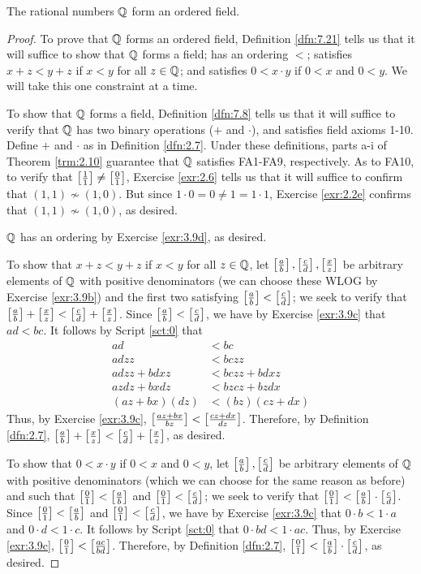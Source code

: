 \documentclass[../main.tex]{subfiles}
\begin{document}
\begin{theorem}\label{trm:7.29}
    The rational numbers $\mathbb{Q}$ form an ordered field.
    \begin{proof}
        To prove that $\mathbb{Q}$ forms an ordered field, Definition \ref{dfn:7.21} tells us that it will suffice to show that $\mathbb{Q}$ forms a field; has an ordering $<$; satisfies $x+z<y+z$ if $x<y$ for all $z\in\mathbb{Q}$; and satisfies $0<x\cdot y$ if $0<x$ and $0<y$. We will take this one constraint at a time.\par\smallskip
        To show that $\mathbb{Q}$ forms a field, Definition \ref{dfn:7.8} tells us that it will suffice to verify that $\mathbb{Q}$ has two binary operations ($+$ and $\cdot$), and satisfies field axioms 1-10. Define $+$ and $\cdot$ as in Definition \ref{dfn:2.7}. Under these definitions, parts a-i of Theorem \ref{trm:2.10} guarantee that $\mathbb{Q}$ satisfies FA1-FA9, respectively. As to FA10, to verify that $\left[ \frac{1}{1} \right]\neq\left[ \frac{0}{1} \right]$, Exercise \ref{exr:2.6} tells us that it will suffice to confirm that $(1,1)\nsim(1,0)$. But since $1\cdot 0=0\neq 1=1\cdot 1$, Exercise \ref{exr:2.2e} confirms that $(1,1)\nsim(1,0)$, as desired.\par
        $\mathbb{Q}$ has an ordering by Exercise \ref{exr:3.9d}, as desired.\par
        To show that $x+z<y+z$ if $x<y$ for all $z\in\mathbb{Q}$, let $\left[ \frac{a}{b} \right],\left[ \frac{c}{d} \right],\left[ \frac{x}{z} \right]$ be arbitrary elements of $\mathbb{Q}$ with positive denominators (we can choose these WLOG by Exercise \ref{exr:3.9b}) and the first two satisfying $\left[ \frac{a}{b} \right]<\left[ \frac{c}{d} \right]$; we seek to verify that $\left[ \frac{a}{b} \right]+\left[ \frac{x}{z} \right]<\left[ \frac{c}{d} \right]+\left[ \frac{x}{z} \right]$. Since $\left[ \frac{a}{b} \right]<\left[ \frac{c}{d} \right]$, we have by Exercise \ref{exr:3.9c} that $ad<bc$. It follows by Script \ref{sct:0} that
        \begin{align*}
            ad &< bc\\
            adzz &< bczz\\
            adzz+bdxz &< bczz+bdxz\\
            azdz+bxdz &< bzcz+bzdx\\
            (az+bx)(dz) &< (bz)(cz+dx)
        \end{align*}
        Thus, by Exercise \ref{exr:3.9c}, $\left[ \frac{az+bx}{bz} \right]<\left[ \frac{cz+dx}{dz} \right]$. Therefore, by Definition \ref{dfn:2.7}, $\left[ \frac{a}{b} \right]+\left[ \frac{x}{z} \right]<\left[ \frac{c}{d} \right]+\left[ \frac{x}{z} \right]$, as desired.\par
        To show that $0<x\cdot y$ if $0<x$ and $0<y$, let $\left[ \frac{a}{b} \right],\left[ \frac{c}{d} \right]$ be arbitrary elements of $\mathbb{Q}$ with positive denominators (which we can choose for the same reason as before) and such that $\left[ \frac{0}{1} \right]<\left[ \frac{a}{b} \right]$ and $\left[ \frac{0}{1} \right]<\left[ \frac{c}{d} \right]$; we seek to verify that $\left[ \frac{0}{1} \right]<\left[ \frac{a}{b} \right]\cdot\left[ \frac{c}{d} \right]$. Since $\left[ \frac{0}{1} \right]<\left[ \frac{a}{b} \right]$ and $\left[ \frac{0}{1} \right]<\left[ \frac{c}{d} \right]$, we have by Exercise \ref{exr:3.9c} that $0\cdot b<1\cdot a$ and $0\cdot d<1\cdot c$. It follows by Script \ref{sct:0} that $0\cdot bd<1\cdot ac$. Thus, by Exercise \ref{exr:3.9c}, $\left[ \frac{0}{1} \right]<\left[ \frac{ac}{bd} \right]$. Therefore, by Definition \ref{dfn:2.7}, $\left[ \frac{0}{1} \right]<\left[ \frac{a}{b} \right]\cdot\left[ \frac{c}{d} \right]$, as desired.

\end{proof}
\end{theorem}
\end{document}
